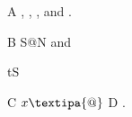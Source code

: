 \documentclass{article}
\begin{document}
A \textschwa, \textesh, \textturnv, \textltailn{} and \textipa{\textrhookschwa\textbullseye\textdyoghlig\textbabygamma}.

B {\tipaencoding S@N} and \begin{IPA}tS\end{IPA} C \mbox{} $x\mbox{\textipa{@}}$ D \textbarb\textbard\textdzlig.
\end{document}
